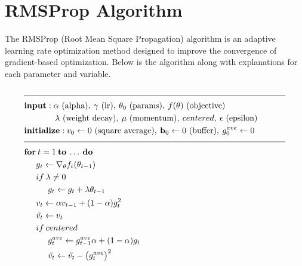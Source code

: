 \documentclass{article}
\begin{document}
\section*{RMSProp Algorithm}

The RMSProp (Root Mean Square Propagation) algorithm is an adaptive learning rate optimization method designed to improve the convergence of gradient-based optimization. Below is the algorithm along with explanations for each parameter and variable.

\[
\begin{aligned}
    & \rule{110mm}{0.4pt} \\
    & \textbf{input} : \alpha \text{ (alpha)}, \: \gamma \text{ (lr)}, \: \theta_0 \text{ (params)}, \: f(\theta) \text{ (objective)} \\
    & \hspace{13mm} \lambda \text{ (weight decay)}, \: \mu \text{ (momentum)}, \: centered, \: \epsilon \text{ (epsilon)} \\
    & \textbf{initialize} : v_0 \leftarrow 0 \text{ (square average)}, \: \textbf{b}_0 \leftarrow 0 \text{ (buffer)}, \: g^{ave}_0 \leftarrow 0 \\[-1.ex]
    & \rule{110mm}{0.4pt} \\
    & \textbf{for} \: t=1 \: \textbf{to} \: \ldots \: \textbf{do} \\
    & \hspace{5mm} g_t \leftarrow \nabla_{\theta} f_t (\theta_{t-1}) \\
    & \hspace{5mm} if \: \lambda \neq 0 \\
    & \hspace{10mm} g_t \leftarrow g_t + \lambda \theta_{t-1} \\
    & \hspace{5mm} v_t \leftarrow \alpha v_{t-1} + (1 - \alpha) g^2_t \hspace{8mm} \\
    & \hspace{5mm} \tilde{v_t} \leftarrow v_t \\
    & \hspace{5mm} if \: centered \\
    & \hspace{10mm} g^{ave}_t \leftarrow g^{ave}_{t-1} \alpha + (1-\alpha) g_t \\
    & \hspace{10mm} \tilde{v_t} \leftarrow \tilde{v_t} - \big(g^{ave}_{t} \big)^2 \\

\end{aligned}\]
\end{document}
